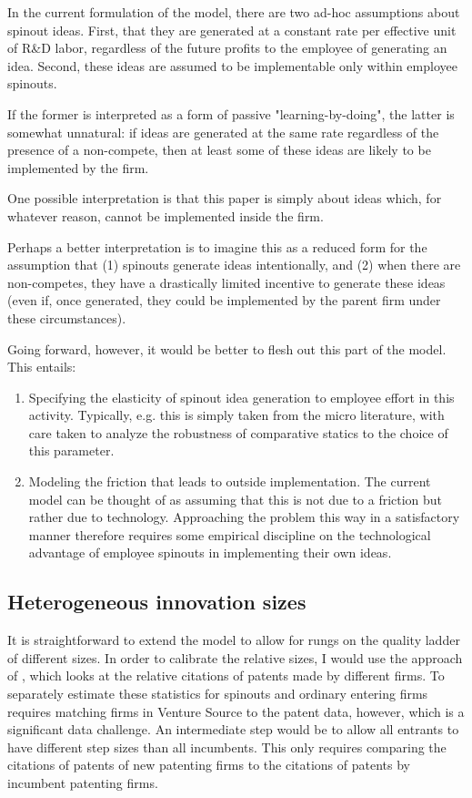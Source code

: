 \documentclass[12pt,english]{article}
\theoremstyle{remark}
\begin{document}
In the current formulation of the model, there are two ad-hoc assumptions about spinout ideas. First, that they are generated at a constant rate per effective unit of R\&D labor, regardless of the future profits to the employee of generating an idea. Second, these ideas are assumed to be implementable only within employee spinouts. 

If the former is interpreted as a form of passive "learning-by-doing", the latter is somewhat unnatural: if ideas are generated at the same rate regardless of the presence of a non-compete, then at least some of these ideas are likely to be implemented by the firm.

One possible interpretation is that this paper is simply about ideas which, for whatever reason, cannot be implemented inside the firm. 

Perhaps a better interpretation is to imagine this as a reduced form for the assumption that (1) spinouts generate ideas intentionally, and (2) when there are non-competes, they have a drastically limited incentive to generate these ideas (even if, once generated, they could be implemented by the parent firm under these circumstances).

Going forward, however, it would be better to flesh out this part of the model. This entails: 

\begin{enumerate}
	\item Specifying the elasticity of spinout idea generation to employee effort in this activity. Typically, e.g. \cite{baslandze_spinout_2019} this is simply taken from the micro literature, with care taken to analyze the robustness of comparative statics to the choice of this parameter.
	\item Modeling the friction that leads to outside implementation. The current model can be thought of as assuming that this is not due to a friction but rather due to technology. Approaching the problem this way in a satisfactory manner therefore requires some empirical discipline on the technological advantage of employee spinouts in implementing their own ideas.
\end{enumerate}


\subsection{Heterogeneous innovation sizes}

It is straightforward to extend the model to allow for rungs on the quality ladder of different sizes. In order to calibrate the relative sizes, I would use the approach of \cite{akcigit_growth_2018}, which looks at the relative citations of patents made by different firms. To separately estimate these statistics for spinouts and ordinary entering firms requires matching firms in Venture Source to the patent data, however, which is a significant data challenge. An intermediate step would be to allow all entrants to have different step sizes than all incumbents. This only requires comparing the citations of patents of new patenting firms to the citations of patents by incumbent patenting firms. 
\end{document}
